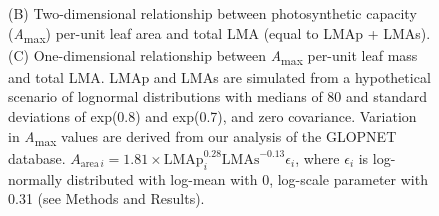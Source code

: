 \documentclass[
  12pt,
  a4paper,
,tablecaptionabove
]{scrartcl}
\providecommand{\DIFaddendFL}{} %
\DeclareRobustCommand{\DIFaddendFL}{\DIFOaddendFL \let\includegraphics\DIFOincludegraphics} %
\begin{document}
\begin{figure}
{{(B) Two-dimensional relationship between photosynthetic capacity (\emph{A}\textsubscript{max}) per-unit leaf area and total LMA (equal to LMAp + LMAs).
(C) One-dimensional relationship between \emph{A}\textsubscript{max} per-unit leaf mass and total LMA.
LMAp and LMAs are simulated from a hypothetical scenario of lognormal distributions with medians of 80 and standard deviations of exp(0.8) and exp(0.7), and zero covariance.
Variation in \emph{A}\textsubscript{max} values are derived from our analysis of the GLOPNET database. \(A_{\mathrm{area} \, i}=1.81 \times \mathrm{LMAp}_i^{0.28}\mathrm{LMAs}^{-0.13}\epsilon_i\), where \(\epsilon_i\) is log-normally distributed with log-mean with 0, log-scale parameter with 0.31 (see Methods and Results).}\label{fig:Hplt}
}
\DIFaddendFL \end{figure}
\end{document}
